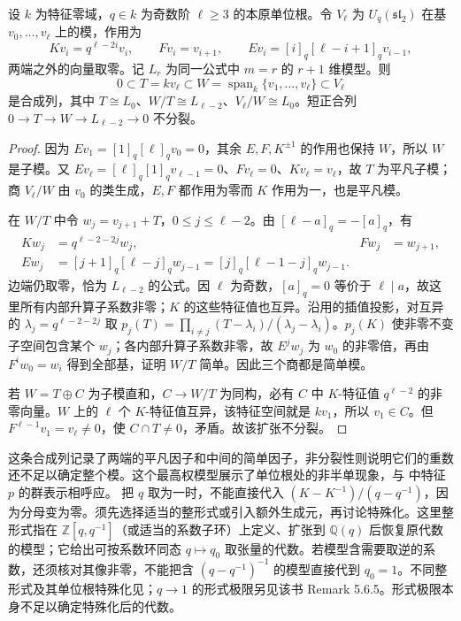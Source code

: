 \begin{proposition}\label{b5:prop:B-root-of-unity-filtration}
	设 \(k\) 为特征零域，\(q\in k\) 为奇数阶 \(\ell\ge3\) 的本原单位根。令 \(V_\ell\) 为 \(U_q(\mathfrak{sl}_2)\) 在基 \(v_0,\ldots,v_\ell\) 上的模，作用为
	\[
		Kv_i=q^{\ell-2i}v_i,\qquad Fv_i=v_{i+1},\qquad Ev_i=[i]_q[\ell-i+1]_qv_{i-1},
	\]
	两端之外的向量取零。记 \(L_r\) 为同一公式中 \(m=r\) 的 \(r+1\) 维模型。则
	\[
		0\subset T=kv_\ell\subset W=\operatorname{span}_k\{v_1,\ldots,v_\ell\}\subset V_\ell
	\]
	是合成列，其中 \(T\cong L_0\)、\(W/T\cong L_{\ell-2}\)、\(V_\ell/W\cong L_0\)。短正合列 \(0\to T\to W\to L_{\ell-2}\to0\) 不分裂。
\end{proposition}
\begin{proof}
	因为 \(Ev_1=[1]_q[\ell]_qv_0=0\)，其余 \(E,F,K^{\pm1}\) 的作用也保持 \(W\)，所以 \(W\) 是子模。又 \(Ev_\ell=[\ell]_q[1]_qv_{\ell-1}=0\)、\(Fv_\ell=0\)、\(Kv_\ell=v_\ell\)，故 \(T\) 为平凡子模；商 \(V_\ell/W\) 由 \(v_0\) 的类生成，\(E,F\) 都作用为零而 \(K\) 作用为一，也是平凡模。

	在 \(W/T\) 中令 \(w_j=v_{j+1}+T\)，\(0\le j\le\ell-2\)。由 \([\ell-a]_q=-[a]_q\)，有
	\[
		\begin{aligned}
			Kw_j&=q^{\ell-2-2j}w_j,& Fw_j&=w_{j+1},\\
			Ew_j&=[j+1]_q[\ell-j]_q w_{j-1} =[j]_q[\ell-1-j]_q w_{j-1}.
		\end{aligned}
	\]
	边端仍取零，恰为 \(L_{\ell-2}\) 的公式。因 \(\ell\) 为奇数，\([a]_q=0\) 等价于 \(\ell\mid a\)，故这里所有内部升算子系数非零；\(K\) 的这些特征值也互异。沿用的插值投影，对互异的 \(\lambda_j=q^{\ell-2-2j}\) 取 \(p_j(T)=\prod_{i\ne j}(T-\lambda_i)/(\lambda_j-\lambda_i)\)。\(p_j(K)\) 使非零不变子空间包含某个 \(w_j\)；各内部升算子系数非零，故 \(E^jw_j\) 为 \(w_0\) 的非零倍，再由 \(F^iw_0=w_i\) 得到全部基，证明 \(W/T\) 简单。因此三个商都是简单模。

	若 \(W=T\oplus C\) 为子模直和，\(C\to W/T\) 为同构，必有 \(C\) 中 \(K\)-特征值 \(q^{\ell-2}\) 的非零向量。\(W\) 上的 \(\ell\) 个 \(K\)-特征值互异，该特征空间就是 \(kv_1\)，所以 \(v_1\in C\)。但 \(F^{\ell-1}v_1=v_\ell\ne0\)，使 \(C\cap T\ne0\)，矛盾。故该扩张不分裂。
\end{proof}

这条合成列记录了两端的平凡因子和中间的简单因子，非分裂性则说明它们的重数还不足以确定整个模。这个最高权模型展示了单位根处的非半单现象，与 中特征 \(p\) 的群表示相呼应。
\ProseParagraphBreak
把 \(q\) 取为一时，不能直接代入 \((K-K^{-1})/(q-q^{-1})\)，因为分母变为零。须先选择适当的整形式或引入额外生成元，再讨论特殊化。这里整形式指在 \(\mathbb Z[q,q^{-1}]\)（或适当的系数子环）上定义、扩张到 \(\mathbb Q(q)\) 后恢复原代数的模型；它给出可按系数环同态 \(q\mapsto q_0\) 取张量的代数。若模型含需要取逆的系数，还须核对其像非零，不能把含 \((q-q^{-1})^{-1}\) 的模型直接代到 \(q_0=1\)。不同整形式及其单位根特殊化见\cite[Section 5.6, pp. 101--102]{EtingofEtAl2015TensorCategories}；\(q\to1\) 的形式极限另见该书 Remark 5.6.5。形式极限本身不足以确定特殊化后的代数。

